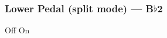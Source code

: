 \subsubsection{Lower Pedal (split mode) --- B$\flat$2}









































Off
On
